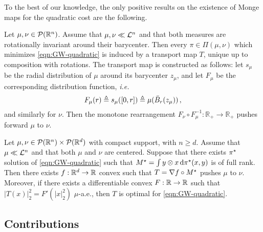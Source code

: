\noindent To the best of our knowledge, the only positive results on the existence of Monge maps for the quadratic cost are the following.
\begin{proposition}
    Let $\mu,\nu\in\mathcal{P}(\mathbb{R}^n)$. Assume that $\mu,\nu\ll\mathcal{L}^n$ and that both measures are rotationally invariant around their barycenter. Then every $\pi \in \Pi(\mu, \nu)$ which minimizes \cref{eqn:GW-quadratic} is induced by a transport map $T$, unique up to composition with rotations. The transport map is constructed as follows: let $s_\mu$ be the radial distribution of $\mu$ around its barycenter $z_\mu$, and let $F_\mu$ be the corresponding distribution function, \textit{i.e.} $$F_\mu(r)\triangleq s_\mu([0, r])\triangleq \mu(\bar{B}_r(z_\mu))\,,$$ and similarly for $\nu$. Then the monotone rearrangement $F_\nu \circ F_\mu^{-1}: \mathbb{R}_{+} \to \mathbb{R}_{+}$ pushes forward $\mu$ to $\nu$.
\end{proposition}
\begin{proposition}
    Let $\mu, \nu\in \mathcal{P}(\mathbb{R}^n)\times \mathcal{P}(\mathbb{R}^d)$ with compact support, with $n\geq d$.
    Assume that $\mu\ll\mathcal{L}^n$ and that both $\mu$ and $\nu$ are centered. Suppose that there exists $\pi^\star$ solution of \cref{eqn:GW-quadratic} such that $M^\star=\int y\otimes x \,\mathrm d\pi^\star(x, y)$ is of full rank. Then there exists $f:\mathbb{R}^d\to\mathbb{R}$ convex such that $T=\nabla f \circ M^\star$ pushes $\mu$ to $\nu$. Moreover, if there exists a differentiable convex $F:\mathbb{R}\to\mathbb{R}$ such that $|T(x)|_2^2=F'(|x|^2_2)$ $\mu$-a.e., then $T$ is optimal for \cref{eqn:GW-quadratic}.
\end{proposition}


\subsection{Contributions}
\label{sec:contributions}

